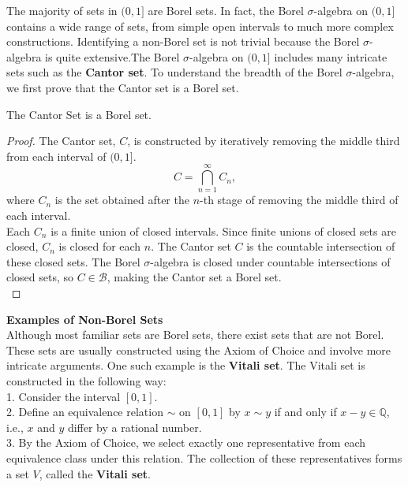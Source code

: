 The majority of sets in $(0, 1]$ are Borel sets. In fact, the Borel $\sigma$-algebra on $(0, 1]$ contains a wide range of sets, from simple open intervals to much more complex constructions. Identifying a non-Borel set is not trivial because the Borel $\sigma$-algebra is quite extensive.The Borel $\sigma$-algebra on $(0, 1]$ includes many intricate sets such as the \textbf{Cantor set}. To understand the breadth of the Borel $\sigma$-algebra, we first prove that the Cantor set is a Borel set.

\begin{lemma}
   The Cantor Set is a Borel set.
\end{lemma}

\begin{proof}
   The Cantor set, $C$, is constructed by iteratively removing the middle third from each interval of $(0, 1]$. 
\[
C = \bigcap_{n=1}^{\infty} C_n,
\]
where $C_n$ is the set obtained after the $n$-th stage of removing the middle third of each interval.\\

Each $C_n$ is a finite union of closed intervals. Since finite unions of closed sets are closed, $C_n$ is closed for each $n$. The Cantor set $C$ is the countable intersection of these closed sets. The Borel $\sigma$-algebra is closed under countable intersections of closed sets, so $C \in \mathcal{B}$, making the Cantor set a Borel set.\\
\end{proof}

\textbf{Examples of Non-Borel Sets}\\

Although most familiar sets are Borel sets, there exist sets that are not Borel. These sets are usually constructed using the Axiom of Choice and involve more intricate arguments. One such example is the \textbf{Vitali set}. The Vitali set is constructed in the following way:\\

1. Consider the interval $[0, 1]$.\\
2. Define an equivalence relation $\sim$ on $[0, 1]$ by $x \sim y$ if and only if $x - y \in \mathbb{Q}$, i.e., $x$ and $y$ differ by a rational number.\\
3. By the Axiom of Choice, we select exactly one representative from each equivalence class under this relation. The collection of these representatives forms a set $V$, called the \textbf{Vitali set}.\\

